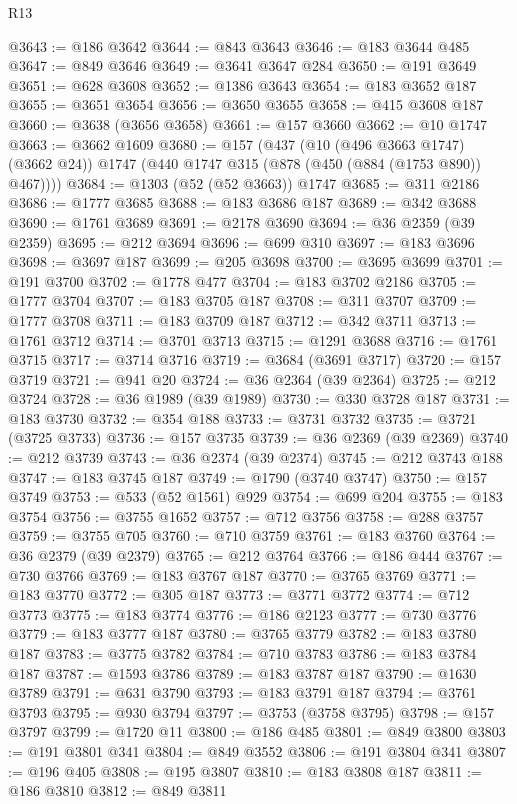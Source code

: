 \begin{lexlean}{R13}
\begin{coremodule}
@3643 := @186 @3642
@3644 := @843 @3643
@3646 := @183 @3644 @485
@3647 := @849 @3646
@3649 := @3641 @3647 @284
@3650 := @191 @3649
@3651 := @628 @3608
@3652 := @1386 @3643
@3654 := @183 @3652 @187
@3655 := @3651 @3654
@3656 := @3650 @3655
@3658 := @415 @3608 @187
@3660 := @3638 (@3656 @3658)
@3661 := @157 @3660
@3662 := @10 @1747
@3663 := @3662 @1609
@3680 := @157
    (@437
      (@10 (@496 @3663 @1747) (@3662 @24))
      @1747
      (@440 @1747 @315 (@878 (@450 (@884 (@1753 @890)) @467))))
@3684 := @1303 (@52 (@52 @3663)) @1747
@3685 := @311 @2186
@3686 := @1777 @3685
@3688 := @183 @3686 @187
@3689 := @342 @3688
@3690 := @1761 @3689
@3691 := @2178 @3690
@3694 := @36 @2359 (@39 @2359)
@3695 := @212 @3694
@3696 := @699 @310
@3697 := @183 @3696
@3698 := @3697 @187
@3699 := @205 @3698
@3700 := @3695 @3699
@3701 := @191 @3700
@3702 := @1778 @477
@3704 := @183 @3702 @2186
@3705 := @1777 @3704
@3707 := @183 @3705 @187
@3708 := @311 @3707
@3709 := @1777 @3708
@3711 := @183 @3709 @187
@3712 := @342 @3711
@3713 := @1761 @3712
@3714 := @3701 @3713
@3715 := @1291 @3688
@3716 := @1761 @3715
@3717 := @3714 @3716
@3719 := @3684 (@3691 @3717)
@3720 := @157 @3719
@3721 := @941 @20
@3724 := @36 @2364 (@39 @2364)
@3725 := @212 @3724
@3728 := @36 @1989 (@39 @1989)
@3730 := @330 @3728 @187
@3731 := @183 @3730
@3732 := @354 @188
@3733 := @3731 @3732
@3735 := @3721 (@3725 @3733)
@3736 := @157 @3735
@3739 := @36 @2369 (@39 @2369)
@3740 := @212 @3739
@3743 := @36 @2374 (@39 @2374)
@3745 := @212 @3743 @188
@3747 := @183 @3745 @187
@3749 := @1790 (@3740 @3747)
@3750 := @157 @3749
@3753 := @533 (@52 @1561) @929
@3754 := @699 @204
@3755 := @183 @3754
@3756 := @3755 @1652
@3757 := @712 @3756
@3758 := @288 @3757
@3759 := @3755 @705
@3760 := @710 @3759
@3761 := @183 @3760
@3764 := @36 @2379 (@39 @2379)
@3765 := @212 @3764
@3766 := @186 @444
@3767 := @730 @3766
@3769 := @183 @3767 @187
@3770 := @3765 @3769
@3771 := @183 @3770
@3772 := @305 @187
@3773 := @3771 @3772
@3774 := @712 @3773
@3775 := @183 @3774
@3776 := @186 @2123
@3777 := @730 @3776
@3779 := @183 @3777 @187
@3780 := @3765 @3779
@3782 := @183 @3780 @187
@3783 := @3775 @3782
@3784 := @710 @3783
@3786 := @183 @3784 @187
@3787 := @1593 @3786
@3789 := @183 @3787 @187
@3790 := @1630 @3789
@3791 := @631 @3790
@3793 := @183 @3791 @187
@3794 := @3761 @3793
@3795 := @930 @3794
@3797 := @3753 (@3758 @3795)
@3798 := @157 @3797
@3799 := @1720 @11
@3800 := @186 @485
@3801 := @849 @3800
@3803 := @191 @3801 @341
@3804 := @849 @3552
@3806 := @191 @3804 @341
@3807 := @196 @405
@3808 := @195 @3807
@3810 := @183 @3808 @187
@3811 := @186 @3810
@3812 := @849 @3811

\end{coremodule}
\end{lexlean}

